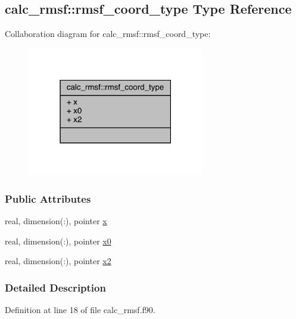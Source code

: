 \hypertarget{structcalc__rmsf_1_1rmsf__coord__type}{\subsection{calc\-\_\-rmsf\-:\-:rmsf\-\_\-coord\-\_\-type Type Reference}
\label{structcalc__rmsf_1_1rmsf__coord__type}
}


Collaboration diagram for calc\-\_\-rmsf\-:\-:rmsf\-\_\-coord\-\_\-type\-:
\nopagebreak
\begin{figure}[H]
\begin{center}
\leavevmode
\includegraphics[width=219pt]{structcalc__rmsf_1_1rmsf__coord__type__coll__graph}
\end{center}
\end{figure}
\subsubsection*{Public Attributes}
\begin{DoxyCompactItemize}
\item 
real, dimension(\-:), pointer \hyperlink{structcalc__rmsf_1_1rmsf__coord__type_af139832c8b6bd82bf495a1fd670d42fd}{x}
\item 
real, dimension(\-:), pointer \hyperlink{structcalc__rmsf_1_1rmsf__coord__type_a1cdd3cfcbbad90682a24378ea57f15db}{x0}
\item 
real, dimension(\-:), pointer \hyperlink{structcalc__rmsf_1_1rmsf__coord__type_aa6ddd12282b5ef3eee84f8790fd3b719}{x2}
\end{DoxyCompactItemize}


\subsubsection{Detailed Description}


Definition at line 18 of file calc\-\_\-rmsf.\-f90.



